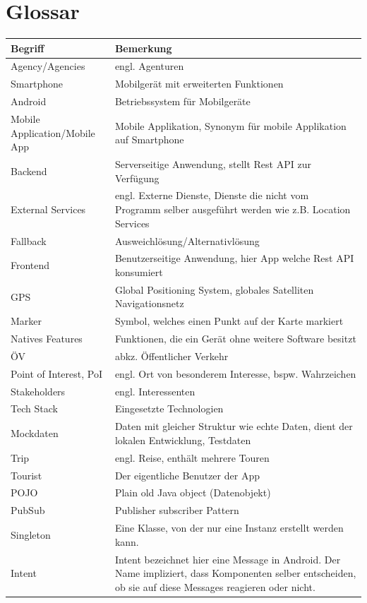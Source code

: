 \documentclass[a4paper,10pt,xetex]{article}
\begin{document}
\section{Glossar}\label{glossar}
\begin{longtabu} to \textwidth { | l | X[l] | }
\hline
\textbf{Begriff} & \textbf{Bemerkung}\\\hline
\endhead

Agency/Agencies & engl. Agenturen\\\hline
Smartphone & Mobilgerät mit erweiterten Funktionen\\\hline
Android & Betriebssystem für Mobilgeräte\\\hline
Mobile Application/Mobile App & Mobile Applikation, Synonym für mobile Applikation auf Smartphone\\\hline
Backend & Serverseitige Anwendung, stellt Rest API zur Verfügung\\\hline
External Services & engl. Externe Dienste, Dienste die nicht vom Programm selber ausgeführt werden wie z.B. Location Services\\\hline
Fallback & Ausweichlösung/Alternativlösung\\\hline
Frontend & Benutzerseitige Anwendung, hier App welche Rest API konsumiert\\\hline
GPS & Global Positioning System, globales Satelliten Navigationsnetz\\\hline
Marker & Symbol, welches einen Punkt auf der Karte markiert\\\hline
Natives Features & Funktionen, die ein Gerät ohne weitere Software besitzt\\\hline
ÖV & abkz. Öffentlicher Verkehr\\\hline
Point of Interest, PoI & engl. Ort von besonderem Interesse, bspw. Wahrzeichen\\\hline
Stakeholders & engl. Interessenten\\\hline
Tech Stack & Eingesetzte Technologien\\\hline
Mockdaten & Daten mit gleicher Struktur wie echte Daten, dient der lokalen Entwicklung, Testdaten \\\hline
Trip & engl. Reise, enthält mehrere Touren\\\hline
Tourist & Der eigentliche Benutzer der App\\\hline
POJO & Plain old Java object (Datenobjekt)\\\hline
PubSub & Publisher subscriber Pattern\\\hline
Singleton & Eine Klasse, von der nur eine Instanz erstellt werden kann.\\\hline
Intent & Intent bezeichnet hier eine Message in Android. Der Name impliziert, dass
Komponenten selber entscheiden, ob sie auf diese Messages reagieren oder nicht.\\\hline
\end{longtabu}
\end{document}
